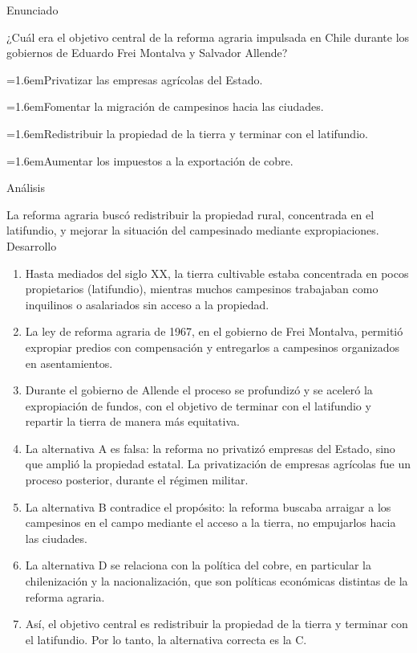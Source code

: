 \documentclass[10pt,a4paper,twocolumn]{article}
\newcommand{\alternativa}[2]{\par\noindent\hangindent=1.6em\hangafter=1\makebox[1.6em][l]{\tecla{#1}}#2\par}
\newcommand{\clave}[1]{\par\smallskip{\sffamily\footnotesize\color{esmeralda} Clave \teclaok{#1}}\par}
\begin{document}
\begin{ejemplo}
{\sffamily\footnotesize\color{zinc500} Enunciado}\par
¿Cuál era el objetivo central de la reforma agraria impulsada en Chile durante los gobiernos de Eduardo Frei Montalva y Salvador Allende?
\alternativa{A}{Privatizar las empresas agrícolas del Estado.}
\alternativa{B}{Fomentar la migración de campesinos hacia las ciudades.}
\alternativa{C}{Redistribuir la propiedad de la tierra y terminar con el latifundio.}
\alternativa{D}{Aumentar los impuestos a la exportación de cobre.}
\clave{C}
{\sffamily\footnotesize\color{zinc500} Análisis}\par La reforma agraria buscó redistribuir la propiedad rural, concentrada en el latifundio, y mejorar la situación del campesinado mediante expropiaciones.
{\sffamily\footnotesize\color{zinc500} Desarrollo}
\begin{enumerate}
  \item Hasta mediados del siglo XX, la tierra cultivable estaba concentrada en pocos propietarios (latifundio), mientras muchos campesinos trabajaban como inquilinos o asalariados sin acceso a la propiedad.
  \item La ley de reforma agraria de 1967, en el gobierno de Frei Montalva, permitió expropiar predios con compensación y entregarlos a campesinos organizados en asentamientos.
  \item Durante el gobierno de Allende el proceso se profundizó y se aceleró la expropiación de fundos, con el objetivo de terminar con el latifundio y repartir la tierra de manera más equitativa.
  \item La alternativa A es falsa: la reforma no privatizó empresas del Estado, sino que amplió la propiedad estatal. La privatización de empresas agrícolas fue un proceso posterior, durante el régimen militar.
  \item La alternativa B contradice el propósito: la reforma buscaba arraigar a los campesinos en el campo mediante el acceso a la tierra, no empujarlos hacia las ciudades.
  \item La alternativa D se relaciona con la política del cobre, en particular la chilenización y la nacionalización, que son políticas económicas distintas de la reforma agraria.
  \item Así, el objetivo central es redistribuir la propiedad de la tierra y terminar con el latifundio. Por lo tanto, la alternativa correcta es la C.
\end{enumerate}
\end{ejemplo}
\end{document}
